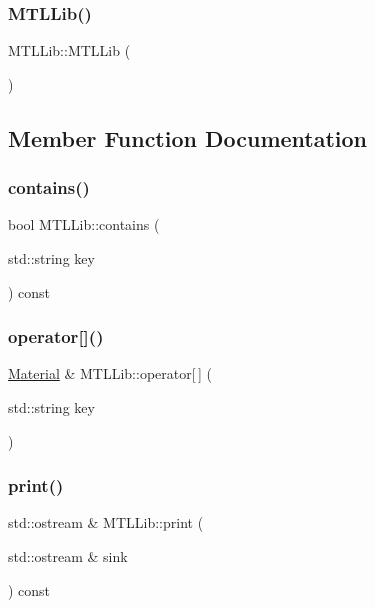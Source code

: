 \subsubsection{\texorpdfstring{MTLLib()}{MTLLib()}\hspace{0.1cm}{\footnotesize\ttfamily [2/2]}}
{\footnotesize\ttfamily M\+T\+L\+Lib\+::\+M\+T\+L\+Lib (\begin{DoxyParamCaption}{ }\end{DoxyParamCaption})\hspace{0.3cm}{\ttfamily [default]}}



\subsection{Member Function Documentation}
\mbox{\label{classMTLLib_a11ea8731bc57aae94ad40af443821cb4}} 
\subsubsection{\texorpdfstring{contains()}{contains()}}
{\footnotesize\ttfamily bool M\+T\+L\+Lib\+::contains (\begin{DoxyParamCaption}\item[{std\+::string}]{key }\end{DoxyParamCaption}) const}

\mbox{\label{classMTLLib_a47584cec05a84d6b173c655515788b76}} 
\subsubsection{\texorpdfstring{operator[]()}{operator[]()}}
{\footnotesize\ttfamily \mbox{\hyperlink{classMaterial}{Material}} \& M\+T\+L\+Lib\+::operator\mbox{[}$\,$\mbox{]} (\begin{DoxyParamCaption}\item[{std\+::string}]{key }\end{DoxyParamCaption})}

\mbox{\label{classMTLLib_a058c3501417711e8e3e3f30f99a930b5}} 
\subsubsection{\texorpdfstring{print()}{print()}}
{\footnotesize\ttfamily std\+::ostream \& M\+T\+L\+Lib\+::print (\begin{DoxyParamCaption}\item[{std\+::ostream \&}]{sink }\end{DoxyParamCaption}) const}



